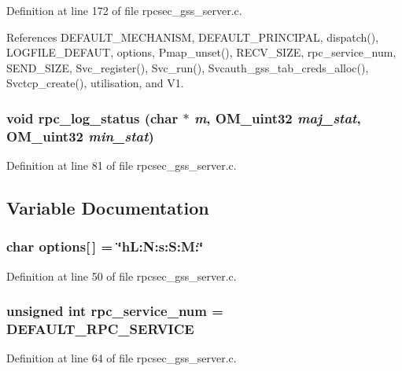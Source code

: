 Definition at line 172 of file rpcsec\_\-gss\_\-server.c.

References DEFAULT\_\-MECHANISM, DEFAULT\_\-PRINCIPAL, dispatch(), LOGFILE\_\-DEFAUT, options, Pmap\_\-unset(), RECV\_\-SIZE, rpc\_\-service\_\-num, SEND\_\-SIZE, Svc\_\-register(), Svc\_\-run(), Svcauth\_\-gss\_\-tab\_\-creds\_\-alloc(), Svctcp\_\-create(), utilisation, and V1.
\subsubsection{\setlength{\rightskip}{0pt plus 5cm}void rpc\_\-log\_\-status (char $\ast$ {\em m}, OM\_\-uint32 {\em maj\_\-stat}, OM\_\-uint32 {\em min\_\-stat})}\label{rpcsec__gss__server_8c_a16}




Definition at line 81 of file rpcsec\_\-gss\_\-server.c.

\subsection{Variable Documentation}
\subsubsection{\setlength{\rightskip}{0pt plus 5cm}char {\bf options}[$\,$] = \char`\"{}h\-L:N:s:S:M:\char`\"{}}\label{rpcsec__gss__server_8c_a12}




Definition at line 50 of file rpcsec\_\-gss\_\-server.c.
\subsubsection{\setlength{\rightskip}{0pt plus 5cm}unsigned int {\bf rpc\_\-service\_\-num} = DEFAULT\_\-RPC\_\-SERVICE}\label{rpcsec__gss__server_8c_a15}




Definition at line 64 of file rpcsec\_\-gss\_\-server.c.
